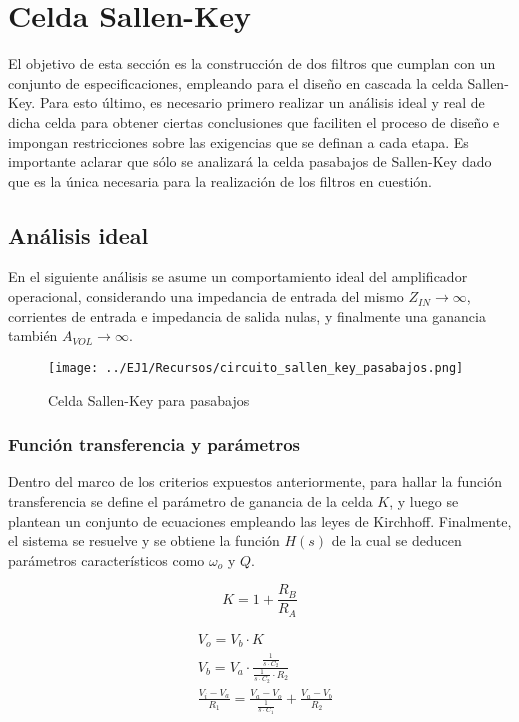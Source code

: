 \section{Celda Sallen-Key}
El objetivo de esta secci\'on es la construcci\'on de dos filtros que cumplan con un conjunto de especificaciones,
empleando para el dise\~no en cascada la celda Sallen-Key. Para esto \'ultimo, es necesario primero realizar un an\'alisis ideal
y real de dicha celda para obtener ciertas conclusiones que faciliten el proceso de dise\~no e impongan restricciones sobre
las exigencias que se definan a cada etapa. Es importante aclarar que s\'olo se analizar\'a la celda pasabajos de Sallen-Key dado
que es la \'unica necesaria para la realizaci\'on de los filtros en cuesti\'on.

\subsection{An\'alisis ideal}
En el siguiente an\'alisis se asume un comportamiento ideal del amplificador operacional, considerando una impedancia de entrada del mismo
$Z_{IN} \rightarrow \infty$, corrientes de entrada e impedancia de salida nulas, y finalmente una ganancia tambi\'en $A_{VOL} \rightarrow \infty$.

\begin{figure}[H]
    \centering
    \texttt{[image: ../EJ1/Recursos/circuito\_sallen\_key\_pasabajos.png]}
    \caption{Celda Sallen-Key para pasabajos}
    \label{circuito_sallen_key_pasabajos}
\end{figure}

\subsubsection{Funci\'on transferencia y par\'ametros}
Dentro del marco de los criterios expuestos anteriormente, para hallar la funci\'on transferencia se define el par\'ametro de ganancia de la celda $K$, y luego
se plantean un conjunto de ecuaciones empleando las leyes de Kirchhoff. Finalmente, el sistema se resuelve y se obtiene la funci\'on $H(s)$ de la cual se deducen par\'ametros
caracter\'isticos como $\omega_o$ y $Q$.

\begin{equation}
    K = 1 + \frac{R_B}{R_A}
    \label{eq:sallen_key_k}
\end{equation}

\begin{align*}
    & V_o = V_b \cdot K \\
    & V_b = V_a \cdot \frac{\frac{1}{s \cdot C_2}}{\frac{1}{s \cdot C_2} \cdot R_2} \\
    & \frac{V_i - V_a}{R_1} = \frac{V_a - V_o}{\frac{1}{s \cdot C_1}} + \frac{V_a - V_b}{R_2}
\end{align*}

